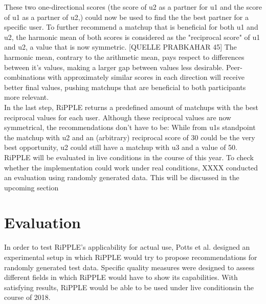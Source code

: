 \documentclass[nochapterpage,bigchapter,linedtoc,longdoc,colorback,accentcolor=tud3b]{tudreport}
\begin{document}
These two one-directional scores (the score of u2 as a partner for u1 and the score of u1 as a partner of u2,) could now be used to find the the best partner for a specific user. To further recommend a matchup that is beneficial for both u1 and u2, the harmonic mean of both scores is considered as the "reciprocal score" of u1 and u2, a value that is now symmetric. [QUELLE PRABKAHAR 45] The harmonic mean, contrary to the arithmetic mean, pays respect to differences between it's values, making a larger gap between values less desirable. Peer-combinations with approximately similar scores in each direction will receive better final values, pushing matchups that are beneficial to both participants more relevant.\\
In the last step, RiPPLE returns a predefined amount of matchups with the best reciprocal values for each user. Although these reciprocal values are now symmetrical, the recommendations don't have to be: While from u1s standpoint the matchup with u2 and an (arbitrary) reciprocal score of 30 could be the very best opportunity, u2 could still have a matchup with u3 and a value of 50.\\
RiPPLE will be evaluated in live conditions in the course of this year. To check whether the implementation could work under real conditions, XXXX conducted an evaluation using randomly generated data. This will be discussed in the upcoming section\\

\section{Evaluation}
In order to test RiPPLE's applicability for actual use, Potts et al. designed an experimental setup in which RiPPLE would try to propose recommendations for randomly generated test data. Specific quality measures were designed to assess different fields in which RiPPLE would have to show its capabilities. With satisfying results, RiPPLE would be able to be used under live conditionsin the course of 2018.\\
\end{document}
